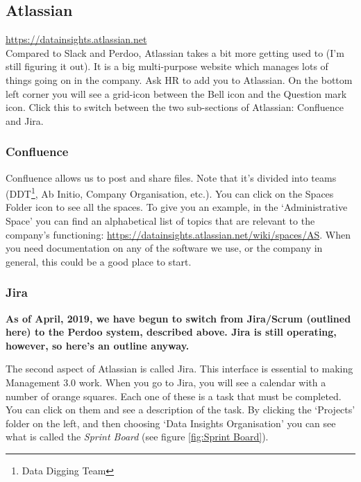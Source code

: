 \documentclass[11pt]{report}
\begin{document}
\subsection{Atlassian}
\label{Atlassian}
\href{https://datainsights.atlassian.net}{https://datainsights.atlassian.net}\\

Compared to Slack and Perdoo, Atlassian takes a bit more getting used to (I'm still figuring it out). It is a big multi-purpose website which manages lots of things going on in the company. Ask HR to add you to Atlassian. On the bottom left corner you will see a grid-icon between the Bell icon and the Question mark icon. Click this to switch between the two sub-sections of Atlassian: Confluence and Jira.

\subsubsection{Confluence}
Confluence allows us to post and share files. Note that it's divided into teams (DDT\footnote{Data Digging Team}, Ab Initio, Company Organisation, etc.). You can click on the Spaces Folder icon to see all the spaces. To give you an example, in the `Administrative Space' you can find an alphabetical list of topics that are relevant to the company's functioning: \href{https://datainsights.atlassian.net/wiki/spaces/AS}{https://datainsights.atlassian.net/wiki/spaces/AS}. When you need documentation on any of the software we use, or the company in general, this could be a good place to start.

\subsubsection{Jira}
\label{Jira}
\textbf{As of April, 2019, we have begun to switch from Jira/Scrum (outlined here) to the Perdoo system, described above. Jira is still operating, however, so here's an outline anyway.}

The second aspect of Atlassian is called Jira. This interface is essential to making Management 3.0 work. When you go to Jira, you will see a calendar with a number of orange squares. Each one of these is a task that must be completed. You can click on them and see a description of the task. By clicking the `Projects' folder on the left, and then choosing `Data Insights Organisation' you can see what is called the \emph{Sprint Board} (see figure \ref{fig:Sprint Board}).
\end{document}
